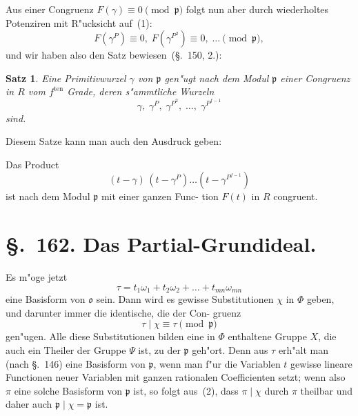 \documentclass[12pt,a4paper]{article}
\theoremstyle{weber}
\newtheorem*{satz}{Satz}
\begin{document}
Aus einer Congruenz $F(\gamma) \equiv 0 \pmod{\mathfrak{p}}$ folgt nun aber
durch wiederholtes Potenziren mit R"ucksicht auf~(1):
\[
F(\gamma^P) \equiv 0,\; F(\gamma^{P^2}) \equiv 0,\; \dots \pmod{\mathfrak{p}},
\]
und wir haben also den Satz bewiesen~(\S.~150, 2.):

\begin{satz}
Eine Primitivwurzel $\gamma$ von $\mathfrak{p}$ gen"ugt nach
dem Modul $\mathfrak{p}$ einer Congruenz in $R$ vom $f^{\mathrm{ten}}$ Grade,
deren s"ammtliche Wurzeln
\[
\gamma,\; \gamma^P,\; \gamma^{P^2},\; \dots,\; \gamma^{P^{f-1}}
\]
sind.
\end{satz}

Diesem Satze kann man auch den Ausdruck geben:

Das Product
\begin{equation}\label{eq:s161-8}
(t-\gamma)\,(t-\gamma^P)\dots(t-\gamma^{P^{f-1}})
\end{equation}
ist nach dem Modul $\mathfrak{p}$ mit einer ganzen Func-
tion $F(t)$ in $R$ congruent.

\newpage
\section*{\S.~162. Das Partial-Grundideal.}

Es m"oge jetzt
\begin{equation}\label{eq:s162-1}
\tau = t_1\omega_1 + t_2\omega_2 + \dots + t_{mn}\omega_{mn}
\end{equation}
eine Basisform von $\mathfrak{o}$ sein. Dann wird es gewisse Substitutionen
$\chi$ in $\varPhi$ geben, und darunter immer die identische, die der Con-
gruenz
\begin{equation}\label{eq:s162-2}
\tau \mid \chi \equiv \tau \pmod{\mathfrak{p}}
\end{equation}
gen"ugen. Alle diese Substitutionen bilden eine in $\varPhi$ enthaltene
Gruppe $X$, die auch ein Theiler der Gruppe $\varPsi$ ist, zu der $\mathfrak{p}$
geh"ort. Denn aus $\tau$ erh"alt man (nach \S.~146) eine Basisform
von $\mathfrak{p}$, wenn man f"ur die Variablen $t$ gewisse lineare Functionen
neuer Variablen mit ganzen rationalen Coefficienten setzt; wenn
also $\pi$ eine solche Basisform von $\mathfrak{p}$ ist, so folgt aus~(2), dass $\pi \mid \chi$
durch $\pi$ theilbar und daher auch $\mathfrak{p} \mid \chi = \mathfrak{p}$ ist.
\end{document}
